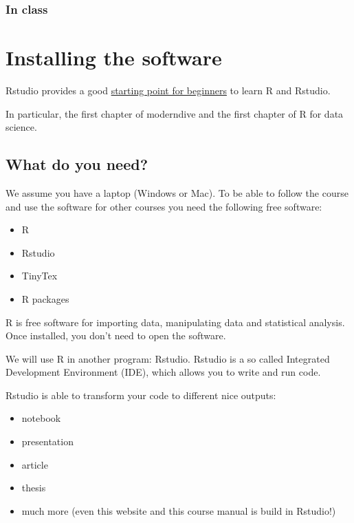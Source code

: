 \documentclass[
]{book}
\providecommand{\tightlist}{%
  \setlength{\itemsep}{0pt}\setlength{\parskip}{0pt}}
\begin{document}
\hypertarget{in-class-4}{%
\subsection{In class}\label{in-class-4}}

\hypertarget{installing-the-software}{%
\chapter{Installing the software}\label{installing-the-software}}

Rstudio provides a good \href{https://education.rstudio.com/learn/beginner/}{starting point for beginners} to learn R and Rstudio.

In particular, the first chapter of moderndive and the first chapter of R for data science.

\hypertarget{what-do-you-need}{%
\section{What do you need?}\label{what-do-you-need}}

We assume you have a laptop (Windows or Mac). To be able to follow the course and use the software for other courses you need the following free software:

\begin{itemize}
\tightlist
\item
  R
\item
  Rstudio
\item
  TinyTex
\item
  R packages
\end{itemize}

R is free software for importing data, manipulating data and statistical analysis. Once installed, you don't need to open the software.

We will use R in another program: Rstudio. Rstudio is a so called Integrated Development Environment (IDE), which allows you to write and run code.

Rstudio is able to transform your code to different nice outputs:

\begin{itemize}
\tightlist
\item
  notebook
\item
  presentation
\item
  article
\item
  thesis
\item
  much more (even this website and this course manual is build in Rstudio!)
\end{itemize}
\end{document}
